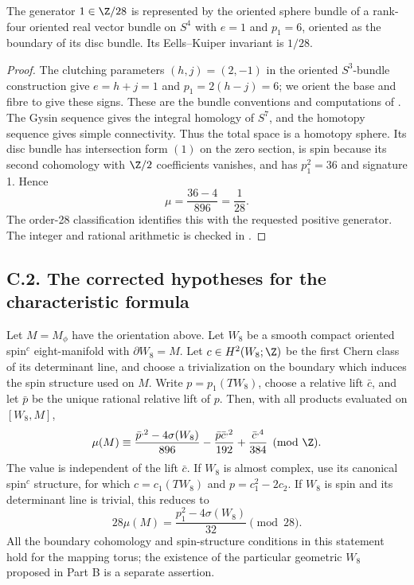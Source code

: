 \begin{proposition}
The generator $1\in\Z/28$ is represented by the oriented sphere
bundle of a rank-four oriented real vector bundle on $S^4$ with
$e=1$ and $p_1=6$, oriented as the boundary of its disc bundle.
Its Eells--Kuiper invariant is $1/28$.
\end{proposition}
\begin{proof}
The clutching parameters $(h,j)=(2,-1)$ in the oriented
$S^3$-bundle construction give $e=h+j=1$ and $p_1=2(h-j)=6$;
we orient the base and fibre to give these signs. These are the
bundle conventions and computations of \citet[Section 6,
equations (12)--(13)]{EellsKuiper1962}. The Gysin sequence gives
the integral homology of $S^7$, and the homotopy sequence gives
simple connectivity. Thus the total space is a homotopy sphere.
Its disc bundle has intersection form $(1)$ on the zero section,
is spin because its second cohomology with $\Z/2$ coefficients
vanishes, and has $p_1^2=36$ and signature 1. Hence
\[
 \mu=\frac{36-4}{896}=\frac1{28}.
\]
The order-28 classification identifies this with the requested
positive generator. The integer and rational arithmetic is checked
in .
\end{proof}

\subsection{C.2. The corrected hypotheses for the characteristic formula}

\begin{theorem}
Let $M=M_\phi$ have the orientation above. Let $W_8$ be a smooth
compact oriented spin$^c$ eight-manifold with $\partial W_8=M$.
Let $c\in H^2(W_8;\Z)$ be the first Chern class of its determinant
line, and choose a trivialization on the boundary which induces the
spin structure used on $M$. Write $p=p_1(TW_8)$, choose a relative
lift $\bar c$, and let $\bar p$ be the unique rational relative lift
of $p$. Then, with all products evaluated on $[W_8,M]$,
\begin{equation}\label{eq:c-spin-c}
 \mu(M)\equiv
 \frac{\bar p^{,2}-4\sigma(W_8)}{896}
 -\frac{\bar p\bar c^{,2}}{192}
 +\frac{\bar c^{,4}}{384}\pmod{\Z}.
\end{equation}
The value is independent of the lift $\bar c$. If $W_8$ is almost
complex, use its canonical spin$^c$ structure, for which
$c=c_1(TW_8)$ and $p=c_1^2-2c_2$. If $W_8$ is spin and its
determinant line is trivial, this reduces to
\[
 28\mu(M)=\frac{p_1^2-4\sigma(W_8)}{32}\pmod{28}.
\]
All the boundary cohomology and spin-structure conditions in this
statement hold for the mapping torus; the existence of the particular
geometric $W_8$ proposed in Part B is a separate assertion.
\end{theorem}

